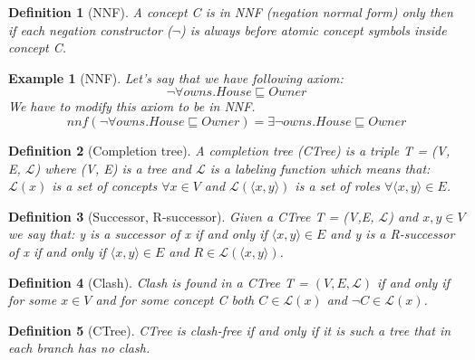\documentclass[12pt,a4paper]{article}
\newtheorem{definition}{Definition}[subsection]
\newtheorem{example}{Example}[subsection]
\begin{document}
\begin{definition}[NNF]
A concept C is in NNF (negation normal form) only then if each negation constructor ($\neg$) is always before atomic concept symbols inside concept C.
\end{definition}

\begin{example}[NNF]
Let's say that we have following axiom:
\[ \neg \forall owns.House \sqsubseteq Owner \]
We have to modify this axiom to be in NNF.
\[ nnf(\neg \forall owns.House \sqsubseteq Owner) = \exists \neg owns.House \sqsubseteq Owner \]
\end{example}

\begin{definition}[Completion tree]
A completion tree (CTree) is a triple T = (V, E, $\mathcal{L}$) where (V, E)
is a tree and $\mathcal{L}$ is a labeling function which means that:
$\mathcal{L}(x)$ is a set of concepts $\forall x \in V$ and
$\mathcal{L}(\langle x, y \rangle )$ is a set of roles $\forall \langle x, y \rangle \in E$.	
\end{definition}

\begin{definition}[Successor, R-successor]
Given a CTree T = (V,E, $\mathcal{L}$) and $x,y \in V$ we say that: y is a successor of x if and only if $\langle x,y \rangle \in E$ and y is a R-successor of x if and only if $\langle x,y \rangle \in E$ and $R \in \mathcal{L}(\langle x,y \rangle)$.
\end{definition}

\begin{definition}[Clash]
Clash is found in a CTree T = $(V,E, \mathcal{L})$ if and only if for some $x \in V$ and for some concept C both $C \in \mathcal{L}(x)$ and $\neg C \in \mathcal{L}(x)$.
	
\end{definition}

\begin{definition}[CTree]
CTree is clash-free if and only if it is such a tree that in each branch has no clash.
\end{definition}
\end{document}
